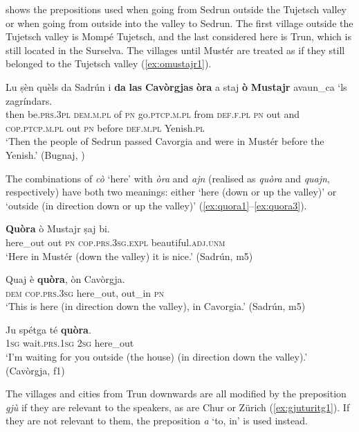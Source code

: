  shows the prepositions used when going from Sedrun outside the Tujetsch valley or when going from outside into the valley to Sedrun. The first village outside the Tujetsch valley is Mompé Tujetsch, and the last considered here is Trun, which is still located in the Surselva. The villages until Mustér  are treated as if they still belonged to the Tujetsch valley (\ref{ex:omustajr1}).

\ea
\label{ex:omustajr1}
\gll Lu ṣèn quèls da Sadrún i \textbf{da} \textbf{las} \textbf{Cavòrgjas} \textbf{òra} a staj \textbf{ò} \textbf{Mustajr} avaun\_ca `ls zagríndars.\\
then be.\textsc{prs.3pl} \textsc{dem.m.pl} of \textsc{pn} go.\textsc{ptcp.m.pl} from \textsc{def.f.pl} \textsc{pn} out and \textsc{cop.ptcp.m.pl} out \textsc{pn} before {} \textsc{def.m.pl} Yenish.\textsc{pl}\\
\glt `Then the people of Sedrun passed  Cavorgia and were in Mustér before the Yenish.' (Bugnaj, \citealt[132]{Büchli1966})
\z

The combinations of \textit{cò} `here' with \textit{òra} and \textit{ajn} (realised as \textit{quòra} and \textit{quajn}, respectively) have both two meanings: either `here (down or up the valley)' or `outside (in direction down or up the valley)' (\ref{ex:quora1}--\ref{ex:quora3}).

\ea
\label{ex:quora1}
\gll \textbf{Quòra} ò Mustajr ṣaj bi.\\
here\_out out \textsc{pn} \textsc{cop.prs.3sg.expl} beautiful.\textsc{adj.unm}\\
\glt `Here in Mustér (down the valley) it is nice.' (Sadrún, m5)
\z

\ea
\label{ex:quora2}
\gll Quaj è \textbf{quòra}, òn Cavòrgja.\\
\textsc{dem} \textsc{cop.prs.3sg} here\_out, out\_in \textsc{pn}\\
\glt `This is here (in direction down the valley), in Cavorgia.' (Sadrún, m5)
\z

\ea
\label{ex:quora3}
\gll Ju spétga té \textbf{quòra}.\\
\textsc{1sg} wait.\textsc{prs.1sg} \textsc{2sg} here\_out\\
\glt `I'm waiting for you outside (the house) (in direction down the valley).' (Cavòrgja, f1)
\z

The villages and cities from Trun downwards are all modified by the preposition \textit{gjù} if they are relevant to the speakers, as are Chur or Zürich (\ref{ex:gjuturitg1}). If they are not relevant to them, the preposition \textit{a} `to, in' is used instead.

